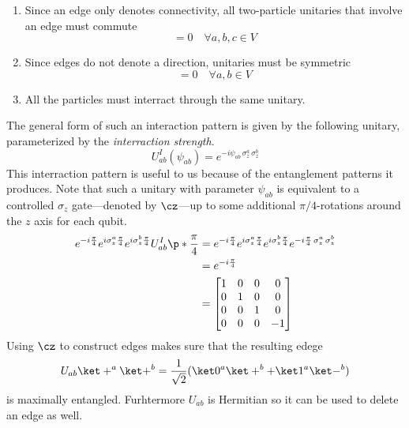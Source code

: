 \begin{enumerate}
  \item Since an edge only denotes connectivity, all two-particle unitaries that involve an edge must commute 
  \begin{equation}
    [U_{ab}, U_{bc}] = 0 \quad \forall a, b, c \in V
  \end{equation}
  \item Since edges do not denote a direction, unitaries must be symmetric 
  \begin{equation}
    [U_{ab}, U_{ba}] = 0 \quad \forall a, b \in V
  \end{equation}
  \item All the particles must interract through the same unitary.
\end{enumerate}

The general form of such an interaction pattern is given by the following unitary, parameterized by the \emph{interraction strength}.
\begin{equation}
  U_{ab}^I(\psi_{ab}) = e^{-i \psi_{ab} \, \sigma_z^a \, \sigma_z^b}
\end{equation}
This interraction pattern is useful to us because of the entanglement patterns it produces. Note that such a unitary with parameter \(\psi_{ab}\) is equivalent to a controlled \(\sigma_z\) gate---denoted by \(\cz\)---up to some additional \(\pi/4\)-rotations around the \(z\) axis for each qubit.
\begin{equation}
  \begin{aligned}
  e^{-i\frac{\pi}{4}} e^{i\sigma_z^a\frac{\pi}{4}} e^{i\sigma_z^b\frac{\pi}{4}} U^I_{ab}\p*{\frac{\pi}{4}} &= e^{-i\frac{\pi}{4}} e^{i\sigma_z^a\frac{\pi}{4}} e^{i\sigma_z^b\frac{\pi}{4}} e^{-i \frac{\pi}{4} \, \sigma_z^a \, \sigma_z^b}\\
  &= e^{-i\frac{\pi}{4}}\\
  &= \begin{bmatrix}
    1 & 0 & 0 & 0 \\
    0 & 1 & 0 & 0 \\
    0 & 0 & 1 & 0 \\
    0 & 0 & 0 & -1
  \end{bmatrix}
\end{aligned}
\end{equation}
Using \(\cz\) to construct edges makes sure that the resulting edege
\begin{equation}
  U_{ab}\ket+^a\ket+^b = \frac{1}{\sqrt2}(\ket0^a\ket+^b + \ket1^a\ket-^b) 
\end{equation}
is maximally entangled. Furhtermore \(U_{ab}\)\/ is Hermitian so it can be used to delete an edge as well.

